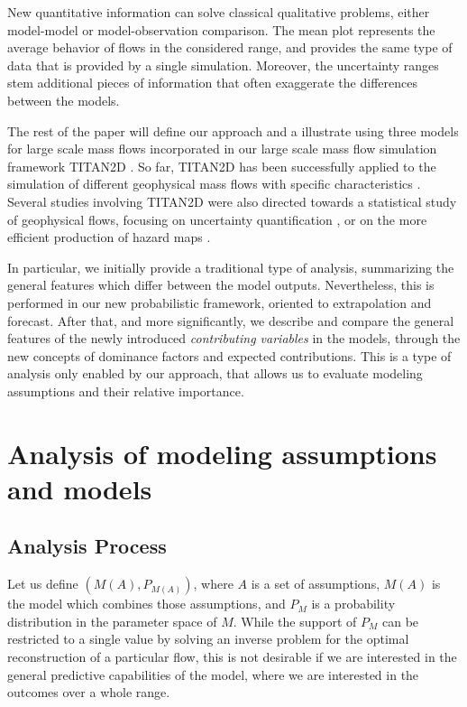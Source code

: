 \documentclass{article}
\begin{document}
New quantitative information can solve classical qualitative problems, either model-model or model-observation comparison. The mean plot represents the average behavior of flows in the considered range, and provides the same type of data that is provided by a single simulation. Moreover, the uncertainty ranges stem additional pieces of information that often exaggerate the differences between the models.


The rest of the paper will define our approach and a illustrate using three models for large scale mass flows incorporated in our large scale mass flow simulation framework  TITAN2D \citep{Patra2005,Patra2006, Yu2009, Aghakhani2016}.
So far, TITAN2D has been successfully applied to the simulation of different geophysical mass flows with specific characteristics \citep{Sheridan2005, Rupp2006, Norini2008, Charbonnier2009, Procter2010, Sheridan2010, Sulpizio2010, Capra2011}. Several studies involving TITAN2D were also directed towards a statistical study of geophysical flows, focusing on uncertainty quantification \citep{Dalbey2008, Dalbey2009, Stefanescu2012b, Stefanescu2012a}, or on the more efficient production of hazard maps \citep{Bayarri2009, Spiller2014, Bayarri2015, Ogburn2016}.

In particular, we initially provide a traditional type of analysis, summarizing the general features which differ between the model outputs. Nevertheless, this is performed in our new probabilistic framework, oriented to extrapolation and forecast. After that, and more significantly, we describe and compare the general features of the newly introduced \emph{contributing variables} in the models, through the new concepts of dominance factors and expected contributions. This is a type of analysis only enabled by our approach, that allows us to evaluate modeling assumptions and their relative importance.

\section{Analysis of modeling assumptions and models }
\subsection{Analysis Process}
Let us define $\left(M(A), P_{M(A)}\right)$, where $A$ is a set of assumptions, $M(A)$ is the model which combines those assumptions, and $P_M$ is a probability distribution in the parameter space of $M$. While the support of $P_M$ can be restricted to a single value by solving an inverse problem for the optimal reconstruction of a particular flow, this is not desirable if we are interested in the general predictive capabilities of the model, where we are interested in the outcomes over a whole range.
\end{document}
